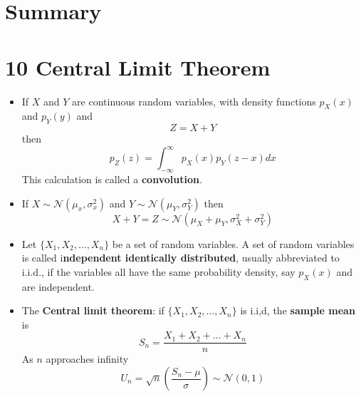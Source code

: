 \ifind
\section*{Summary}
\else
\section*{10 Central Limit Theorem}
\fi

\begin{itemize}
\item If $X$ and $Y$ are continuous random variables, with density
functions $p_X(x)$ and $p_Y(y)$ and 
\begin{equation}
Z=X+Y
\end{equation}
then
\begin{equation}
p_Z(z)=\int_{-\infty}^\infty {p_X(x)p_Y(z-x)dx}
\end{equation}
This calculation is called a \textbf{convolution}.

\item If  $X\sim\mathcal{N}(\mu_x,\sigma_x^2)$ and $Y\sim\mathcal{N}(\mu_Y,\sigma_Y^2)$ then
  \begin{equation}
X+Y=Z\sim \mathcal{N}(\mu_X+\mu_Y,\sigma_X^2+\sigma_Y^2)
  \end{equation}

\item Let $\{X_1,X_2,\ldots,X_n\}$ be a set of random variables. A set of
random variables is called i\textbf{ndependent identically distributed},
usually abbreviated to i.i.d., if the variables all have the same
probability density, say $p_X(x)$ and are independent.
  
\item The \textbf{Central limit theorem}: if  $\{X_1,X_2,\ldots,X_n\}$ is i.i,d, the \textbf{sample mean} is
  \begin{equation}
S_n=\frac{X_1+X_2+\ldots+X_n}{n}
\end{equation}
  As $n$ approaches infinity
\begin{equation}
U_n=\sqrt{n}\left(\frac{S_n-\mu}{\sigma}\right) \sim \mathcal{N}(0,1)
\end{equation}
\end{itemize}

